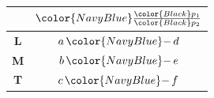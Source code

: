 \begin{minipage}{0.13\textwidth}
    \centering
    \begin{tabular}{c|c}
                   & ${\color{NavyBlue}\frac{\color{Black}p_1}{\color{Black}p_2}}$ \\ \hline
        \textbf{L} & $a\,{\color{NavyBlue}-}\,d$                                   \\
        \textbf{M} & $b\,{\color{NavyBlue}-}\,e$                                   \\
        \textbf{T} & $c\,{\color{NavyBlue}-}\,f$
    \end{tabular}
\end{minipage}

